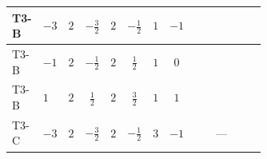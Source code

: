 \documentclass[8pt]{article}
\begin{document}
\begin{landscape}
\begin{longtable}{@{}llcccccc >{\raggedright\arraybackslash}p{0.21\linewidth} >{\raggedright\arraybackslash}p{0.21\linewidth} >{\raggedright\arraybackslash}p{0.21\linewidth}@{}}
T3-B & $-3$ & $2$ & $-\frac{3}{2}$ & $2$ & $-\frac{1}{2}$ & $1$ & $-1$ & \scriptsize\adjustbox{max width=\linewidth}{$\begin{gathered} +4 {\lambda_{12}^{(1)}} {m_2^2}\end{gathered}$} & \scriptsize\adjustbox{max width=\linewidth}{$\begin{gathered} {m_1^2} (2 T_{\nu}^{(1)}+6 {\lambda_{S_1}^{(1)}})\end{gathered}$} & \scriptsize\adjustbox{max width=\linewidth}{$\begin{gathered} -\frac{9 {g_2}^2 {m_1^2}}{2}\end{gathered}$} \\
\midrule
T3-B & $-1$ & $2$ & $-\frac{1}{2}$ & $2$ & $\frac{1}{2}$ & $1$ & $0$ & \scriptsize\adjustbox{max width=\linewidth}{$\begin{gathered} +4 {\lambda_{12}^{(1)}} {m_2^2}\end{gathered}$} & \scriptsize\adjustbox{max width=\linewidth}{$\begin{gathered} {m_1^2} (2 T_{\nu}^{(1)}+6 {\lambda_{S_1}^{(1)}})\end{gathered}$} & \scriptsize\adjustbox{max width=\linewidth}{$\begin{gathered} -\frac{9 {g_2}^2 {m_1^2}}{2}\end{gathered}$} \\
\midrule
T3-B & $1$ & $2$ & $\frac{1}{2}$ & $2$ & $\frac{3}{2}$ & $1$ & $1$ & \scriptsize\adjustbox{max width=\linewidth}{$\begin{gathered} +4 {\lambda_{12}^{(1)}} {m_2^2}\end{gathered}$} & \scriptsize\adjustbox{max width=\linewidth}{$\begin{gathered} {m_1^2} (2 T_{\nu}^{(1)}+6 {\lambda_{S_1}^{(1)}})\end{gathered}$} & \scriptsize\adjustbox{max width=\linewidth}{$\begin{gathered} -\frac{9 {g_2}^2 {m_1^2}}{2}\end{gathered}$} \\
\midrule
T3-C & $-3$ & $2$ & $-\frac{3}{2}$ & $2$ & $-\frac{1}{2}$ & $3$ & $-1$ & \scriptsize\adjustbox{max width=\linewidth}{$\begin{gathered} +4 {\lambda_{12}^{(1)}} {m_2^2}\end{gathered}$} & --- & \scriptsize\adjustbox{max width=\linewidth}{$\begin{gathered} -\frac{9 {g_2}^2 {m_1^2}}{2}\end{gathered}$} \\

\end{longtable}
\end{landscape}
\end{document}
